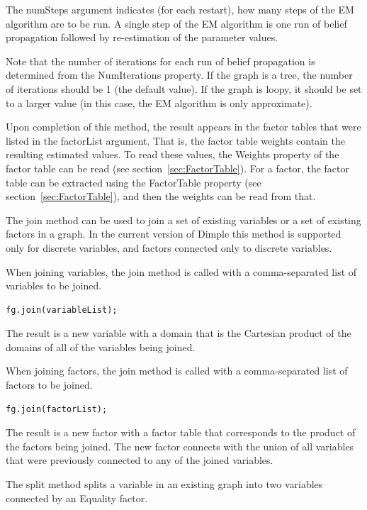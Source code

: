 The numSteps argument indicates (for each restart), how many steps of the EM algorithm are to be run.  A single step of the EM algorithm is one run of belief propagation followed by re-estimation of the parameter values.

Note that the number of iterations for each run of belief propagation is determined from the NumIterations property.  If the graph is a tree, the number of iterations should be 1 (the default value).  If the graph is loopy, it should be set to a larger value (in this case, the EM algorithm is only approximate).

Upon completion of this method, the result appears in the factor tables that were listed in the factorList argument.  That is, the factor table weights contain the resulting estimated values.  To read these values, the Weights property of the factor table can be read (see section~\ref{sec:FactorTable}).  For a factor, the factor table can be extracted using the FactorTable property (see section~\ref{sec:FactorTable}), and then the weights can be read from that.



The join method can be used to join a set of existing variables or a set of existing factors in a graph.  In the current version of Dimple this method is supported only for discrete variables, and factors connected only to discrete variables.

When joining variables, the join method is called with a comma-separated list of variables to be joined.

\begin{lstlisting}
fg.join(variableList);
\end{lstlisting}

The result is a new variable with a domain that is the Cartesian product of the domains of all of the variables being joined.

When joining factors, the join method is called with a comma-separated list of factors to be joined.

\begin{lstlisting}
fg.join(factorList);
\end{lstlisting}

The result is a new factor with a factor table that corresponds to the product of the factors being joined.  The new factor connects with the union of all variables that were previously connected to any of the joined variables.



The split method splits a variable in an existing graph into two variables connected by an Equality factor.

